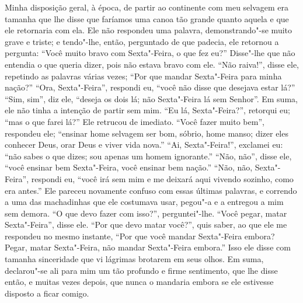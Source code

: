 
Minha disposição geral, à época, de partir ao continente com meu
selvagem era tamanha que lhe disse que faríamos uma canoa tão grande
quanto aquela e que ele retornaria com ela. Ele não respondeu uma
palavra, demonstrando"-se muito grave e triste; e tendo"-lhe, então,
perguntado de que padecia, ele retornou a pergunta: ``Você muito bravo
com Sexta"-Feira, o que fez eu?'' Disse"-lhe que não entendia o que queria
dizer, pois não estava bravo com ele. ``Não raiva!'', disse ele,
repetindo as palavras várias vezes; ``Por que mandar Sexta"-Feira para
minha nação?'' ``Ora, Sexta"-Feira'', respondi eu, ``você não disse que
desejava estar lá?'' ``Sim, sim'', diz ele, ``deseja os dois lá; não
Sexta"-Feira lá sem Senhor''. Em suma, ele não tinha a intenção de partir
sem mim. ``Eu lá, Sexta"-Feira?'', retorqui eu; ``mas o que farei lá?''
Ele retrucou de imediato. ``Você fazer muito bem'', respondeu ele;
``ensinar home selvagem ser bom, sóbrio, home manso; dizer eles conhecer
Deus, orar Deus e viver vida nova.'' ``Ai, Sexta"-Feira!'', exclamei eu:
``não sabes o que dizes; sou apenas um homem ignorante.'' ``Não, não'',
disse ele, ``você ensinar bem Sexta"-Feira, você ensinar bem nação.''
``Não, não, Sexta"-Feira'', respondi eu, ``você irá sem mim e me deixará
aqui vivendo sozinho, como era antes.'' Ele pareceu novamente confuso
com essas últimas palavras, e correndo a uma das machadinhas que ele
costumava usar, pegou"-a e a entregou a mim sem demora. ``O que devo
fazer com isso?'', perguntei"-lhe. ``Você pegar, matar Sexta"-Feira'',
disse ele. ``Por que devo matar você?'', quis saber, ao que ele me
respondeu no mesmo instante, ``Por que você mandar Sexta"-Feira embora?
Pegar, matar Sexta"-Feira, não mandar Sexta"-Feira embora.'' Isso ele
disse com tamanha sinceridade que vi lágrimas brotarem em seus olhos. Em
suma, declarou"-se ali para mim um tão profundo e firme sentimento, que
lhe disse então, e muitas vezes depois, que nunca o mandaria embora se
ele estivesse disposto a ficar comigo.


